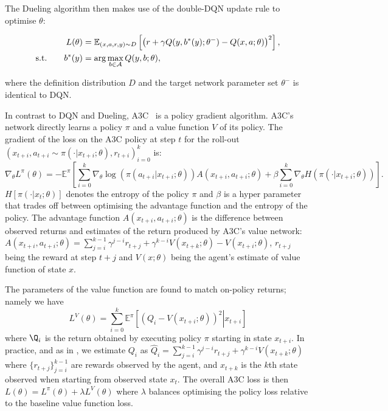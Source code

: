 \documentclass{article}
\begin{document}
The Dueling algorithm then makes use of the double-DQN update rule \citep{van2016deep} to optimise $\theta$:

\begin{align}
L(\theta)&=\mathbb{E}_{(x,a,r,y)\sim D}\left[\left(r+ \gamma Q(y,b^*(y);\theta^-)-Q(x,a;\theta)\right)^2\right],
\\
\text{s.t.}\qquad b^*(y)&=\arg\max_{b\in\mathcal A}Q(y,b;\theta),
\end{align} 

where the definition distribution $D$ and the target network parameter set $\theta^-$ is identical to DQN. 

In contrast to DQN and Dueling, A3C~\citep{mnih2016asynchronous} is a policy gradient algorithm.
A3C's network directly learns a policy $\pi$  and a value function $V$ of its policy.
The gradient of the loss on the A3C policy at step $t$ for the roll-out $(x_{t+i},a_{t+i}\sim\pi(\cdot|x_{t+i};\theta),r_{t+i})_{i=0}^{k}$ is:
\begin{equation}
\nabla_{\theta}L^\pi(\theta)=-\mathbb{E}^\pi\left[\sum_{i=0}^k\nabla_{\theta}\log(\pi(a_{t+i}|x_{t+i};\theta))A(x_{t+i}, a_{t+i};\theta)+\beta\sum_{i=0}^k\nabla_{\theta} H(\pi(\cdot|x_{t+i};\theta))\right].
\end{equation}
$H[\pi(\cdot|x_t; \theta)]$ denotes the entropy of the policy $\pi$ and $\beta$ is a hyper parameter that trades off between optimising the advantage function and the entropy of the policy.
The advantage function $A(x_{t+i}, a_{t+i};\theta)$ is the difference between observed returns and estimates of the return produced by A3C's value network: $A(x_{t+i}, a_{t+i};\theta) = \sum_{j=i}^{k-1}\gamma^{j-i}r_{t+j}+\gamma^{k-i}V(x_{t+k};\theta) - V(x_{t+i};\theta)$, $r_{t+j}$ being the reward at step $t+j$ and $V(x;\theta)$ being the agent's estimate of value function of state $x$.

The parameters of the value function are found to match on-policy returns; namely we have 
\begin{equation}L^V(\theta) = \sum_{i=0}^k \mathbb{E}^\pi\left[(Q_i-V(x_{t+i};\theta))^2 \left|\right. x_{t+i} \right]\end{equation}
\noindent where $\Q_i$ is the return obtained by executing policy $\pi$ starting in state $x_{t+i}$.
In practice, and as in \cite{mnih2016asynchronous}, we estimate $Q_i$ as $\hat{Q}_i=\sum_{j=i}^{k-1}\gamma^{j-i}r_{t+j}+\gamma^{k-i}V(x_{t+k};\theta)$ where $\{r_{t+j}\}_{j=i}^{k-1}$ are rewards observed by the agent, and $x_{t+k}$ is the $k$th state observed when starting from observed state $x_t$.
The overall A3C loss is then $L(\theta) = L^\pi(\theta) + \lambda L^V(\theta)$ where $\lambda$ balances optimising the policy loss relative to the baseline value function loss.
\end{document}
